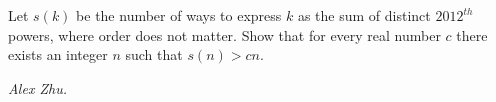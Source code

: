 Let $s(k)$ be the number of ways to express $k$ as the sum of distinct $2012^{th}$ powers, where order does not matter. Show that for every real number $c$ there exists an integer $n$ such that $s(n)>cn$.

\textit{Alex Zhu.}